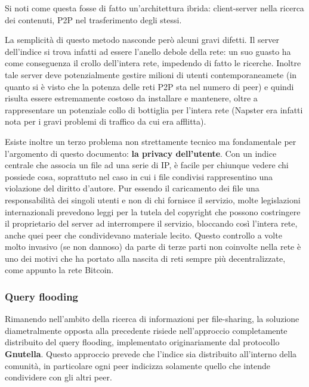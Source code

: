 Si noti come questa fosse di fatto un'architettura ibrida: client-server nella ricerca dei contenuti, P2P nel trasferimento degli stessi.

La semplicità di questo metodo nasconde però alcuni gravi difetti. Il server dell'indice si trova infatti ad essere l'anello debole della rete: un suo guasto ha come conseguenza il crollo dell'intera rete, impedendo di fatto le ricerche. Inoltre tale server deve potenzialmente gestire milioni di utenti contemporaneamete (in quanto si è visto che la potenza delle reti P2P sta nel numero di peer) e quindi risulta essere estremamente costoso da installare e mantenere, oltre a rappresentare un potenziale collo di bottiglia per l'intera rete (Napster era infatti nota per i gravi problemi di traffico da cui era afflitta).

Esiste inoltre un terzo problema non strettamente tecnico ma fondamentale per l'argomento di questo documento: \textbf{la privacy dell'utente}. Con un indice centrale che associa un file ad una serie di IP, è facile per chiunque vedere chi possiede cosa, soprattuto nel caso in cui i file condivisi rappresentino una violazione del diritto d'autore. Pur essendo il caricamento dei file una responsabilità dei singoli utenti e non di chi fornisce il servizio, molte legislazioni internazionali prevedono leggi per la tutela del copyright che possono costringere il proprietario del server ad interrompere il servizio, bloccando così l'intera rete, anche quei peer che condividevano materiale lecito. Questo controllo a volte molto invasivo (se non dannoso) da parte di terze parti non coinvolte nella rete è uno dei motivi che ha portato alla nascita di reti sempre più decentralizzate, come appunto la rete Bitcoin.

\subsubsection{Query flooding}\label{query-flooding}
 Rimanendo nell'ambito della ricerca di informazioni per file-sharing, la soluzione diametralmente opposta alla precedente risiede nell'approccio completamente distribuito del query flooding, implementato originariamente dal protocollo \textbf{Gnutella}. Questo approccio prevede che l'indice sia distribuito all'interno della comunità, in particolare ogni peer indicizza solamente quello che intende condividere con gli altri peer.

